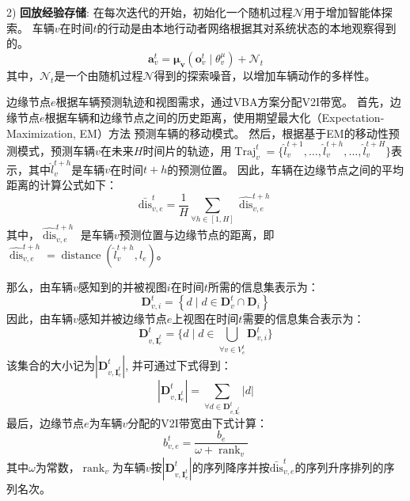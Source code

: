2) \textbf{回放经验存储}:
在每次迭代的开始，初始化一个随机过程$\mathcal{N}$用于增加智能体探索。
车辆$v$在时间$t$的行动是由本地行动者网络根据其对系统状态的本地观察得到的。
\begin{equation}
	\boldsymbol{a}_{v}^{t}=\boldsymbol{\mu}_{\boldsymbol{v}}\left(\boldsymbol{o}_{v}^{t} \mid \theta_{v}^{\mu}\right)+\mathcal{N}_{t}
\end{equation}
\noindent 其中，$\mathcal{N}_{t}$是一个由随机过程$\mathcal{N}$得到的探索噪音，以增加车辆动作的多样性。

边缘节点$e$根据车辆预测轨迹和视图需求，通过VBA方案分配V2I带宽。
首先，边缘节点$e$根据车辆和边缘节点之间的历史距离，使用期望最大化（Expectation-Maximization, EM）方法\cite{hofmann2001unsupervised} 预测车辆的移动模式。
然后，根据基于EM的移动性预测模式，预测车辆$v$在未来$H$时间片的轨迹，用$\operatorname{Traj}_{v}^{t} = \{ \hat{l}_{v}^{t+1}, \dots, \hat{l}_{v}^{t+h}, \dots, \hat{l}_{v}^{t+H}\}$表示，其中$\hat{l}_{v}^{t+h}$是车辆$v$在时间$t+h$的预测位置。
因此，车辆在边缘节点之间的平均距离的计算公式如下：
\begin{equation}
	\operatorname{\bar{dis}}_{v, e}^{t} = \frac{1}{H} {\sum_{\forall h \in [1, H]} \widehat{\operatorname{dis}}_{v, e}^{t+h}}
\end{equation}
其中，$\widehat{\operatorname{dis}}_{v, e}^{t+h}$ 是车辆$v$预测位置与边缘节点的距离，即$\widehat{\operatorname{dis}}_{v, e}^{t+h}=\operatorname{distance}(\hat{l}_{v}^{t+h}, l_{e})$。

那么，由车辆$v$感知到的并被视图$i$在时间$t$所需的信息集表示为：
\begin{equation}
	\mathbf{D}_{v, i}^{t} = \left\{ d \mid  d \in \mathbf{D}_{v}^t \cap  \mathbf{D}_i \right\}
\end{equation}
因此，由车辆$v$感知并被边缘节点$e$上视图在时间$t$需要的信息集合表示为：
\begin{equation}
	\mathbf{D}_{v, {\mathbf{I}_e^t}}^{t} = \{ d \mid  d \in \bigcup_{\forall v \in V_e^t} \mathbf{D}_{v, i}^{t}\}
\end{equation}
\noindent 该集合的大小记为$|\mathbf{D}_{v, {\mathbf{I}_e^t}}^{t}|$, 并可通过下式得到：
\begin{equation}
	|\mathbf{D}_{v, {\mathbf{I}_e^t}}^{t}| = \sum_{\forall d \in \mathbf{D}_{v, {\mathbf{I}_e^t}}^{t}}|d|
\end{equation}
最后，边缘节点$e$为车辆$v$分配的V2I带宽由下式计算：
\begin{equation}
	b_{v, e}^{t} =\frac{b_{e}} {\omega+\operatorname{rank}_{v}}
\end{equation}
\noindent 其中$\omega$为常数，$\operatorname{rank}_{v}$为车辆$v$按$| \mathbf{D}_{v, {\mathbf{I}_e^t}}^{t}|$的序列降序并按$\operatorname{\bar{dis}}_{v, e}^{t}$的序列升序排列的序列名次。


